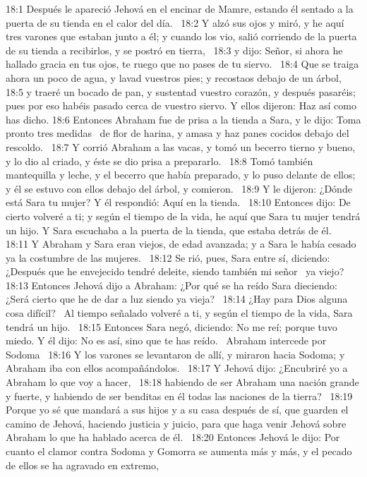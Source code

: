 18:1 Después le apareció Jehová en el encinar de Mamre, estando él sentado a la puerta de su tienda en el calor del día.  
18:2 Y alzó sus ojos y miró, y he aquí tres varones que estaban junto a él; y cuando los vio, salió corriendo de la puerta de su tienda a recibirlos, y se postró en tierra,  
18:3 y dijo: Señor, si ahora he hallado gracia en tus ojos, te ruego que no pases de tu siervo.  
18:4 Que se traiga ahora un poco de agua, y lavad vuestros pies; y recostaos debajo de un árbol,  
18:5 y traeré un bocado de pan, y sustentad vuestro corazón, y después pasaréis; pues por eso habéis pasado cerca de vuestro siervo. Y ellos dijeron: Haz así como has dicho. 
18:6 Entonces Abraham fue de prisa a la tienda a Sara, y le dijo: Toma pronto tres medidas  de flor de harina, y amasa y haz panes cocidos debajo del rescoldo.  
18:7 Y corrió Abraham a las vacas, y tomó un becerro tierno y bueno, y lo dio al criado, y éste se dio prisa a prepararlo.  
18:8 Tomó también mantequilla y leche, y el becerro que había preparado, y lo puso delante de ellos; y él se estuvo con ellos debajo del árbol, y comieron.  
18:9 Y le dijeron: ¿Dónde está Sara tu mujer? Y él respondió: Aquí en la tienda.  
18:10 Entonces dijo: De cierto volveré a ti; y según el tiempo de la vida, he aquí que Sara tu mujer tendrá un hijo. Y Sara escuchaba a la puerta de la tienda, que estaba detrás de él.  
18:11 Y Abraham y Sara eran viejos, de edad avanzada; y a Sara le había cesado ya la costumbre de las mujeres.  
18:12 Se rió, pues, Sara entre sí, diciendo: ¿Después que he envejecido tendré deleite, siendo también mi señor  ya viejo?  
18:13 Entonces Jehová dijo a Abraham: ¿Por qué se ha reído Sara dieciendo: ¿Será cierto que he de dar a luz siendo ya vieja?  
18:14 ¿Hay para Dios alguna cosa difícil?  Al tiempo señalado volveré a ti, y según el tiempo de la vida, Sara tendrá un hijo.  
18:15 Entonces Sara negó, diciendo: No me reí; porque tuvo miedo. Y él dijo: No es así, sino que te has reído.  
Abraham intercede por Sodoma  
18:16 Y los varones se levantaron de allí, y miraron hacia Sodoma; y Abraham iba con ellos acompañándolos.  
18:17 Y Jehová dijo: ¿Encubriré yo a Abraham lo que voy a hacer,  
18:18 habiendo de ser Abraham una nación grande y fuerte, y habiendo de ser benditas en él todas las naciones de la tierra?  
18:19 Porque yo sé que mandará a sus hijos y a su casa después de sí, que guarden el camino de Jehová, haciendo justicia y juicio, para que haga venir Jehová sobre Abraham lo que ha hablado acerca de él.  
18:20 Entonces Jehová le dijo: Por cuanto el clamor contra Sodoma y Gomorra se aumenta más y más, y el pecado de ellos se ha agravado en extremo,  
